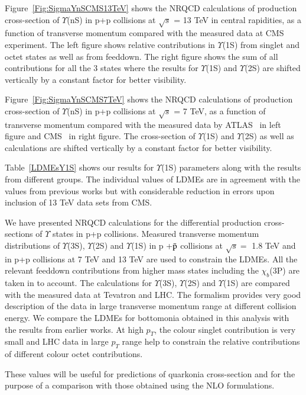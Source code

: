 Figure~\ref{Fig:SigmaYnSCMS13TeV} shows the NRQCD calculations of production cross-section of $\Upsilon$(nS)
      in p+p collisions at $\sqrt{s}$ = 13 TeV in central rapidities, as a function of
      transverse momentum compared with the measured data at CMS~\cite{Sirunyan:2017qdw}
      experiment. The left figure shows relative contributions in $\Upsilon$(1S) from
      singlet and octet states as well as from feeddown. The right figure shows the sum
      of all contributions for all the 3 states where the results for $\Upsilon$(1S) and
      $\Upsilon$(2S) are shifted vertically by a constant factor for better visibility.


Figure~\ref{Fig:SigmaYnSCMS7TeV} shows the NRQCD calculations of production cross-section of $\Upsilon$(nS) in
      p+p collisions at $\sqrt{s}$ = 7 TeV, as a function of transverse momentum compared with
      the measured data by ATLAS~\cite{Aad:2012dlq} in left figure and CMS~\cite{Chatrchyan:2013yna}
      in right figure. The cross-section of $\Upsilon$(1S) and $\Upsilon$(2S) as well as
      calculations are shifted vertically by a constant factor for better visibility.

  
Table~\ref{LDMEsY1S} shows our results for $\Upsilon$(1S) parameters along with
the results from different groups. The individual values of LDMEs are in agreement with
the values from previous works but with considerable reduction in 
errors upon inclusion of 13 TeV data sets from CMS.

We have presented NRQCD calculations for the differential production 
cross-sections of $\Upsilon$ states in  p+p collisions.  Measured transverse momentum
distributions of $\Upsilon$(3S), 
$\Upsilon$(2S) and $\Upsilon$(1S) in p +{$\bar {\rm p}$} collisions at $\sqrt{s}=$ 1.8 TeV and in 
p+p collisions at 7 TeV and 13 TeV are used to constrain the LDMEs. All the relevant feeddown
contributions from higher mass states including the $\chi_{b}$(3P) are taken in to account.
The calculations for  $\Upsilon$(3S), $\Upsilon$(2S) and $\Upsilon$(1S) are compared with 
the measured data at Tevatron and LHC. The formalism provides  very good description of the data in 
large transverse momentum range at different collision energy. 
We compare the LDMEs for bottomonia obtained in this analysis with the results from earlier works.
At high $p_T$, the colour singlet contribution is very small and LHC data in large $p_T$ range 
help to constrain the relative contributions of different colour octet contributions.


These values will be useful for predictions
of quarkonia cross-section and for the purpose of a comparison with those obtained using the NLO formulations.
